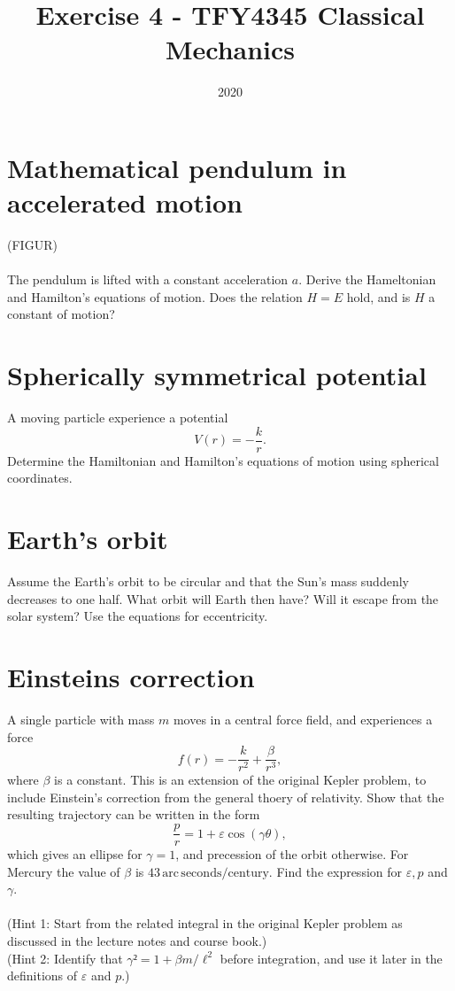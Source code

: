 \documentclass{article}
\title{Exercise 4 - TFY4345 Classical Mechanics}
\date{2020}
\begin{document}
    \maketitle
    \section{Mathematical pendulum in accelerated motion} 
        (FIGUR) \\ \\
        The pendulum is lifted with a constant acceleration $a$. Derive the Hameltonian and Hamilton's equations of motion. Does the relation $H = E$ hold, and is $H$ a constant of motion?

    \section{Spherically symmetrical potential}
        A moving particle experience a potential 
        \begin{equation*}
            V(r) = -\frac{k}{r}.
        \end{equation*}
        Determine the Hamiltonian and Hamilton's equations of motion using spherical coordinates.

    \section{Earth's orbit}
        Assume the Earth's orbit to be circular and that the Sun's mass suddenly decreases to one half. What orbit will Earth then have? Will it escape from the solar system? Use the equations for eccentricity.

    \section{Einsteins correction}
        A single particle with mass $m$ moves in a central force field, and experiences a force 
        \begin{equation*}
            f(r) = -\frac{k}{r^2} + \frac{\beta}{r^3},
        \end{equation*}
        where $\beta$ is a constant. This is an extension of the original Kepler problem, to include Einstein's correction from the general thoery of relativity. Show that the resulting trajectory can be written in the form 
        \begin{equation*}
            \frac{p}{r} = 1 + \varepsilon \cos(\gamma \theta),
        \end{equation*}
        which gives an ellipse for $\gamma = 1$, and precession of the orbit otherwise. For Mercury the value of $\beta$ is $43 \, \mathrm{arc}\, \mathrm{seconds}/\mathrm{century}$. Find the expression for $\varepsilon, p$ and $\gamma$. \\ \\
        (Hint 1: Start from the related integral in the original Kepler problem as discussed in the lecture notes and course book.) \\
        (Hint 2: Identify that $\gamma² = 1 + \beta m / \ell^2$ before integration, and use it later in the definitions of $\varepsilon$ and $p$.)
\end{document}
